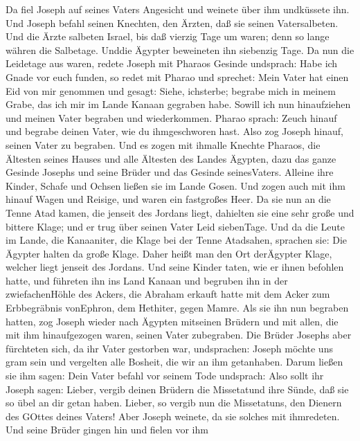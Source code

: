  Da fiel Joseph auf seines Vaters Angesicht und weinete über
ihm undküssete ihn.  Und Joseph befahl seinen Knechten, den
Ärzten, daß sie seinen Vatersalbeten. Und die Ärzte salbeten Israel,
 bis daß vierzig Tage um waren; denn so lange währen die
Salbetage. Unddie Ägypter beweineten ihn siebenzig Tage.  Da
nun die Leidetage aus waren, redete Joseph mit Pharaos Gesinde
undsprach: Habe ich Gnade vor euch funden, so redet mit Pharao und
sprechet:  Mein Vater hat einen Eid von mir genommen und
gesagt: Siehe, ichsterbe; begrabe mich in meinem Grabe, das ich mir im
Lande Kanaan gegraben habe. Sowill ich nun hinaufziehen und meinen Vater
begraben und wiederkommen.  Pharao sprach: Zeuch hinauf und
begrabe deinen Vater, wie du ihmgeschworen hast.  Also zog
Joseph hinauf, seinen Vater zu begraben. Und es zogen mit ihmalle
Knechte Pharaos, die Ältesten seines Hauses und alle Ältesten des Landes
Ägypten,  dazu das ganze Gesinde Josephs und seine Brüder
und das Gesinde seinesVaters. Alleine ihre Kinder, Schafe und Ochsen
ließen sie im Lande Gosen.  Und zogen auch mit ihm hinauf
Wagen und Reisige, und waren ein fastgroßes Heer.  Da sie
nun an die Tenne Atad kamen, die jenseit des Jordans liegt, dahielten
sie eine sehr große und bittere Klage; und er trug über seinen Vater
Leid siebenTage.  Und da die Leute im Lande, die
Kanaaniter, die Klage bei der Tenne Atadsahen, sprachen sie: Die Ägypter
halten da große Klage. Daher heißt man den Ort derÄgypter Klage, welcher
liegt jenseit des Jordans.  Und seine Kinder taten, wie er
ihnen befohlen hatte,  und führeten ihn ins Land Kanaan und
begruben ihn in der zwiefachenHöhle des Ackers, die Abraham erkauft
hatte mit dem Acker zum Erbbegräbnis vonEphron, dem Hethiter, gegen
Mamre.  Als sie ihn nun begraben hatten, zog Joseph wieder
nach Ägypten mitseinen Brüdern und mit allen, die mit ihm hinaufgezogen
waren, seinen Vater zubegraben.  Die Brüder Josephs aber
fürchteten sich, da ihr Vater gestorben war, undsprachen: Joseph möchte
uns gram sein und vergelten alle Bosheit, die wir an ihm getanhaben.
 Darum ließen sie ihm sagen: Dein Vater befahl vor seinem
Tode undsprach:  Also sollt ihr Joseph sagen: Lieber,
vergib deinen Brüdern die Missetatund ihre Sünde, daß sie so übel an dir
getan haben. Lieber, so vergib nun die Missetatuns, den Dienern des
GOttes deines Vaters! Aber Joseph weinete, da sie solches mit
ihmredeten.  Und seine Brüder gingen hin und fielen vor ihm
